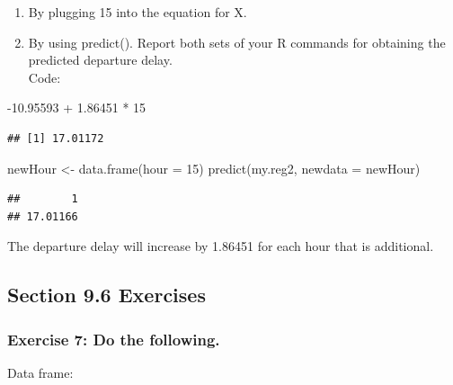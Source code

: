 \documentclass[
]{article}
\newenvironment{Shaded}{\begin{snugshade}}{\end{snugshade}}
\newcommand{\AttributeTok}[1]{\textcolor[rgb]{0.77,0.63,0.00}{#1}}
\newcommand{\DecValTok}[1]{\textcolor[rgb]{0.00,0.00,0.81}{#1}}
\newcommand{\FloatTok}[1]{\textcolor[rgb]{0.00,0.00,0.81}{#1}}
\newcommand{\FunctionTok}[1]{\textcolor[rgb]{0.00,0.00,0.00}{#1}}
\newcommand{\NormalTok}[1]{#1}
\newcommand{\OtherTok}[1]{\textcolor[rgb]{0.56,0.35,0.01}{#1}}
\newcommand{\SpecialCharTok}[1]{\textcolor[rgb]{0.00,0.00,0.00}{#1}}
\providecommand{\tightlist}{%
  \setlength{\itemsep}{0pt}\setlength{\parskip}{0pt}}
\begin{document}
\begin{enumerate}
\def\labelenumi{\arabic{enumi}.}
\tightlist
\item
  By plugging 15 into the equation for X.
\item
  By using predict(). Report both sets of your R commands for obtaining
  the predicted departure delay.\\
  Code:
\end{enumerate}

\begin{Shaded}
\begin{Highlighting}[]
\SpecialCharTok{{-}}\FloatTok{10.95593} \SpecialCharTok{+} \FloatTok{1.86451} \SpecialCharTok{*} \DecValTok{15}
\end{Highlighting}
\end{Shaded}

\begin{verbatim}
## [1] 17.01172
\end{verbatim}

\begin{Shaded}
\begin{Highlighting}[]
\NormalTok{newHour }\OtherTok{\textless{}{-}} \FunctionTok{data.frame}\NormalTok{(}\AttributeTok{hour =} \DecValTok{15}\NormalTok{)}
\FunctionTok{predict}\NormalTok{(my.reg2, }\AttributeTok{newdata =}\NormalTok{ newHour)}
\end{Highlighting}
\end{Shaded}

\begin{verbatim}
##        1 
## 17.01166
\end{verbatim}

The departure delay will increase by 1.86451 for each hour that is
additional.

\hypertarget{section-9.6-exercises-1}{%
\subsection{Section 9.6 Exercises}\label{section-9.6-exercises-1}}

\hypertarget{exercise-7-do-the-following.}{%
\subsubsection{Exercise 7: Do the
following.}\label{exercise-7-do-the-following.}}

\hfill\break
Data frame:
\end{document}
